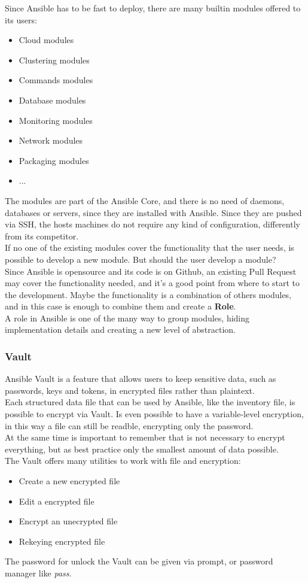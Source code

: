 \documentclass[conference]{IEEEtran}
\begin{document}
Since Ansible has to be fast to deploy, there are many builtin modules offered to its users:
\begin{itemize}
    \item Cloud modules
    \item Clustering modules
    \item Commands modules
    \item Database modules
    \item Monitoring modules
    \item Network modules
    \item Packaging modules
    \item ...
\end{itemize}
The modules are part of the Ansible Core, and there is no need of daemons, databases or servers, since they are installed with Ansible.
Since they are pushed via SSH, the hosts machines do not require any kind of configuration, differently from its competitor.\\
If no one of the existing modules cover the functionality that the user needs, is possible to develop a new module. But should the user develop a module?\\ Since Ansible is opensource and its code is on Github, an existing Pull Request may cover the functionality needed, and it's a good point from where to start to the development. Maybe the functionality is a combination of others modules, and in this case is enough to combine them and create a \textbf{Role}.\\
A role in Ansible is one of the many way to group modules, hiding implementation details and creating a new level of abstraction.\\

\subsubsection{Vault}
Ansible Vault is a feature that allows users to keep sensitive data, such as passwords, keys and tokens, in encrypted files rather than plaintext.\\
Each structured data file that can be used by Ansible, like the inventory file, is possible to encrypt via Vault. Is even possible to have a variable-level encryption, in this way a file can still be readble, encrypting only the password.\\ At the same time is important to remember that is not necessary to encrypt everything, but as best practice only the smallest amount of data possible.\\
The Vault offers many utilities to work with file and encryption:
\begin{itemize}
    \item Create a new encrypted file
    \item Edit a encrypted file
    \item Encrypt an unecrypted file
    \item Rekeying encrypted file
\end{itemize}
The password for unlock the Vault can be given via prompt, or password manager like \textit{pass}.
\end{document}
